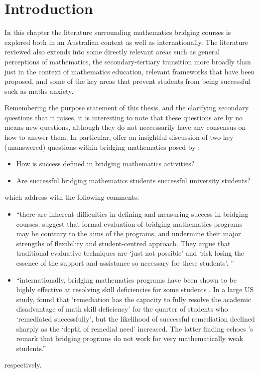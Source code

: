 \documentclass[twoside,12pt,a4paper]{report}
\begin{document}
\section{Introduction}

In this chapter the literature surrounding mathematics bridging courses is explored both in an Australian context as well as internationally. The literature reviewed also extends into some directly relevant areas such as general perceptions of mathematics, the secondary-tertiary transition more broadly than just in the context of mathematics education, relevant frameworks that have been proposed, and some of the key areas that prevent students from being successful such as maths anxiety. 

Remembering the purpose statement of this thesis, and the clarifying secondary questions that it raises, it is interesting to note that these questions are by no means new questions, although they do not neccessarily have any consensus on how to answer them. In particular,  offer an insightful discussion of two key (unanswered) questions within bridging mathematics posed by :
\begin{itemize}
	\item How is success defined in bridging mathematics activities?
	\item Are successful bridging mathematics students successful university students?
\end{itemize}
which  address with the following comments:
\begin{itemize}
	\item ``there are inherent difficulties in defining and measuring success
in bridging courses.  suggest that formal evaluation of bridging
mathematics programs may be contrary to the aims of the programs, and undermine their
major strengths of flexibility and student-centred approach. They argue that traditional
evaluative techniques are ‘just not possible’ and ‘risk losing the essence of the support and
assistance so necessary for these students’. ''
	\item ``internationally, bridging mathematics programs have been
shown to be highly effective at resolving skill deficiencies for some students \cite{Kajander2005, Bahr2008}. In a large US study, \cite[p.442]{Bahr2008} found that ‘remediation has the capacity to fully resolve the
academic disadvantage of math skill deficiency’ for the quarter of students who ‘remediated
successfully’, but the likelihood of successful remediation declined sharply as the ‘depth of
remedial need’ increased. The latter finding echoes \cite{Wood2001}'s remark that bridging
programs do not work for very mathematically weak students.''
\end{itemize}
respectively.
\end{document}
